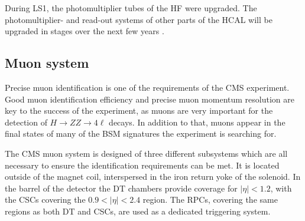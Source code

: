 During \ac{LS1}, the photomultiplier tubes of the \ac{HF} were upgraded. The photomultiplier- and
read-out systems of other parts of the \ac{HCAL} will be upgraded in stages over the
next few years \cite{cms-hcal-upgrade}.


\subsection{Muon system}
\label{sec:CMSLHC_CMS_muons}
Precise muon identification is one of the requirements of the \ac{CMS} 
experiment. Good muon identification efficiency and precise muon momentum 
resolution are key to the success of the experiment, as muons are
very important for the detection of $H\rightarrow ZZ \rightarrow 4\ell$ decays. In addition to that,
muons appear in the final states of many of the \ac{BSM} signatures the experiment is searching for.

The \ac{CMS} muon system \cite{cms-jinst} is designed of three different subsystems which
are all necessary to ensure the identification requirements can be met. It is located
outside of the magnet coil, interspersed in the iron return yoke of the solenoid.
In the barrel of the detector the \ac{DT} chambers provide coverage for $|\eta|<1.2$, with
the \ac{CSCs} covering the $0.9<|\eta|<2.4$ region. The \ac{RPCs}, covering the same
regions as both \ac{DT} and \ac{CSCs}, are used as a dedicated triggering system.

